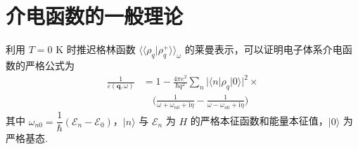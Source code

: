 %
\chapter{介电函数的一般理论}

利用 $T=0$ K 时推迟格林函数 $\langle\langle\rho_{q}|\rho_{q}^{+}\rangle\rangle_{\omega}$ 的莱曼表示，可以证明电子体系介电函数的严格公式为
\begin{equation}
\begin{aligned}
\frac{1}{\varepsilon(\boldsymbol{q},\omega)}
&=1-\frac{4\pi e^{2}}{\hbar q^{2}}\sum_{n}
|\langle n|\rho_{q}|0\rangle|^{2}\times\\
&\quad\biggl(\frac{1}{\omega+\omega_{n0}+\mathrm{i}\eta}
-\frac{1}{\omega-\omega_{n0}+\mathrm{i}\eta}\biggr)
\end{aligned}
\end{equation}
其中 $\omega_{n0}=\dfrac{1}{\hbar}(\mathscr{E}_{n}-\mathscr{E}_{0})$，$|n\rangle$ 与 $\mathscr{E}_{n}$ 为 $H$ 的严格本征函数和能量本征值，$|0\rangle$ 为严格基态.

